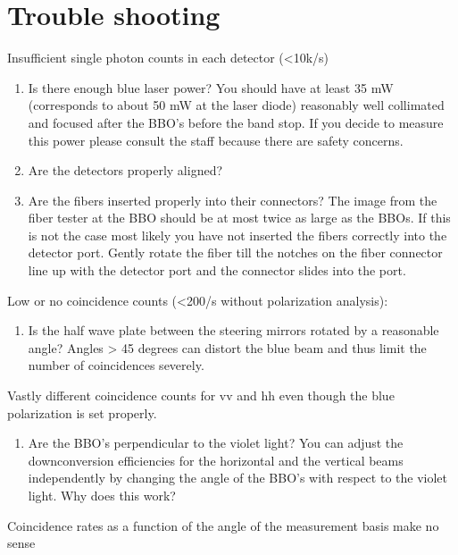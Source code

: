 \documentclass{../lab}
\begin{document}
\section{Trouble shooting}

Insufficient single photon counts in each detector (<10k/s)

\begin{enumerate}
    \item Is there enough blue laser power? You should have at least 35 mW (corresponds to about 50 mW at the laser diode) reasonably well collimated and focused after the BBO's before the band stop. If you decide to measure this power please consult the staff because there are safety concerns.

    \item Are the detectors properly aligned?

    \item Are the fibers inserted properly into their connectors? The image from the fiber tester at the BBO should be at most twice as large as the BBOs. If this is not the case most likely you have not inserted the fibers correctly into the detector port. Gently rotate the fiber till the notches on the fiber connector line up with the detector port and the connector slides into the port.
\end{enumerate}

\noindent Low or no coincidence counts (<200/s without polarization analysis):

\begin{enumerate}
    \item Is the half wave plate between the steering mirrors rotated by a reasonable angle? Angles > 45 degrees can distort the blue beam and thus limit the number of coincidences severely.
\end{enumerate}

\noindent Vastly different coincidence counts for vv and hh even though the blue polarization is set properly.

\begin{enumerate}
    \item Are the BBO's perpendicular to the violet light? You can adjust the downconversion efficiencies for the horizontal and the vertical beams independently by changing the angle of the BBO's with respect to the violet light. Why does this work?
\end{enumerate}

\noindent Coincidence rates as a function of the angle of the measurement basis make no sense
\end{document}
